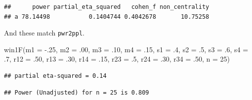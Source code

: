 \documentclass[
]{book}
\newenvironment{Shaded}{\begin{snugshade}}{\end{snugshade}}
\newcommand{\AttributeTok}[1]{\textcolor[rgb]{0.77,0.63,0.00}{#1}}
\newcommand{\ConstantTok}[1]{\textcolor[rgb]{0.00,0.00,0.00}{#1}}
\newcommand{\DecValTok}[1]{\textcolor[rgb]{0.00,0.00,0.81}{#1}}
\newcommand{\FunctionTok}[1]{\textcolor[rgb]{0.00,0.00,0.00}{#1}}
\newcommand{\NormalTok}[1]{#1}
\newcommand{\OtherTok}[1]{\textcolor[rgb]{0.56,0.35,0.01}{#1}}
\newcommand{\SpecialCharTok}[1]{\textcolor[rgb]{0.00,0.00,0.00}{#1}}
\newcommand{\StringTok}[1]{\textcolor[rgb]{0.31,0.60,0.02}{#1}}
\begin{document}
\begin{Shaded}
\end{Shaded}

\begin{verbatim}
##      power partial_eta_squared   cohen_f non_centrality
## a 78.14498           0.1404744 0.4042678       10.75258
\end{verbatim}

And these match \texttt{pwr2ppl}.

\begin{Shaded}
\begin{Highlighting}[]
\FunctionTok{win1F}\NormalTok{(}\AttributeTok{m1 =} \SpecialCharTok{{-}}\NormalTok{.}\DecValTok{25}\NormalTok{, }\AttributeTok{m2 =}\NormalTok{ .}\DecValTok{00}\NormalTok{, }\AttributeTok{m3 =}\NormalTok{ .}\DecValTok{10}\NormalTok{, }\AttributeTok{m4 =}\NormalTok{ .}\DecValTok{15}\NormalTok{,}
      \AttributeTok{s1 =}\NormalTok{ .}\DecValTok{4}\NormalTok{, }\AttributeTok{s2 =}\NormalTok{ .}\DecValTok{5}\NormalTok{, }\AttributeTok{s3 =}\NormalTok{ .}\DecValTok{6}\NormalTok{, }\AttributeTok{s4 =}\NormalTok{ .}\DecValTok{7}\NormalTok{,}
      \AttributeTok{r12 =}\NormalTok{ .}\DecValTok{50}\NormalTok{, }\AttributeTok{r13 =}\NormalTok{ .}\DecValTok{30}\NormalTok{,}
      \AttributeTok{r14 =}\NormalTok{ .}\DecValTok{15}\NormalTok{, }\AttributeTok{r23 =}\NormalTok{ .}\DecValTok{5}\NormalTok{,}
      \AttributeTok{r24 =}\NormalTok{ .}\DecValTok{30}\NormalTok{, }\AttributeTok{r34 =}\NormalTok{ .}\DecValTok{50}\NormalTok{,}
      \AttributeTok{n =} \DecValTok{25}\NormalTok{)}
\end{Highlighting}
\end{Shaded}

\begin{verbatim}
## partial eta-squared = 0.14
\end{verbatim}

\begin{verbatim}
## Power (Unadjusted) for n = 25 is 0.809
\end{verbatim}
\end{document}
